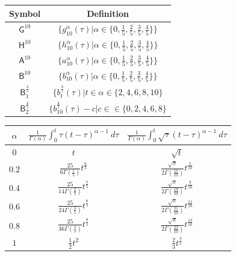 \documentclass{article}
\theoremstyle{theorem}
\theoremstyle{definition}
\begin{document}
\begin{table}[h!]
\centering
 \begin{tabular}{|c || c|} 
 \hline
 Symbol & Definition  \\ [0.1ex]
 \hline 
 \rule{0pt}{2.5ex}
 $\mathsf{G}^{10}$ & $\{g_{10}^{\alpha}(\tau)|\alpha\in\{0,\frac{1}{5},\frac{2}{5},\frac{3}{5},\frac{4}{5}\}\}$\\ [0.5ex]
 $\mathsf{H}^{10}$ & $\{h_{10}^{\alpha}(\tau)|\alpha\in\{0,\frac{1}{5},\frac{2}{5},\frac{3}{5},\frac{4}{5}\}\}$\\ [0.5ex]
 $\mathsf{A}^{10}$ & $\{a_{10}^{\alpha}(\tau)|\alpha\in\{0,\frac{1}{5},\frac{2}{5},\frac{3}{5},\frac{4}{5}\}\}$\\ [0.5ex]
 $\mathsf{B}^{10}$ & $\{b_{10}^{\alpha}(\tau)|\alpha\in\{0,\frac{1}{5},\frac{2}{5},\frac{3}{5},\frac{4}{5}\}\}$\\ [0.5ex]
 $\mathsf{B}^{\frac{4}{5}}_1$ & $\{b_{t}^{\frac{4}{5}}(\tau)|t\in\alpha\in\{2,4,6,8,10\}$\\ [0.5ex]
 $\mathsf{B}^{\frac{4}{5}}_2$ & $\{b_{10}^{\frac{4}{5}}(\tau)-c|c\in\in\{0,2,4,6,8\}$\\ [0.5ex]
 \hline 
 \end{tabular}
\end{table}


\begin{table}[h!]
\centering
 \begin{tabular}{||c|| c| c||} 
 \hline
 $\alpha$ & $\frac{1}{\Gamma(\alpha)}\int_0^t \tau(t-\tau)^{\alpha-1}~d\tau$ & $\frac{1}{\Gamma(\alpha)}\int_0^t \sqrt{\tau}(t-\tau)^{\alpha-1}~d\tau$ \\[0.5ex]
 \hline\hline
 \rule{0pt}{2.5ex}
 $0$ & $t$ & $\sqrt{t}$  \\  
 \rule{0pt}{2.5ex}
 $0.2$ & $\frac{25}{6\Gamma(\frac{1}{5})} t^{\frac{6}{5}}$  & $\frac{\sqrt{\pi}}{2\Gamma(\frac{17}{10})} t^{\frac{7}{10}}$  \\ 
 \rule{0pt}{2.5ex}
 $0.4$ & $\frac{25}{14\Gamma(\frac{2}{5})} t^{\frac{7}{5}}$  & $\frac{\sqrt{\pi}}{2\Gamma(\frac{19}{10})} t^{\frac{9}{10}}$  \\
 \rule{0pt}{2.5ex}
 $0.6$ & $\frac{25}{24\Gamma(\frac{3}{5})} t^{\frac{8}{5}}$  & $\frac{\sqrt{\pi}}{2\Gamma(\frac{21}{10})} t^{\frac{11}{10}}$  \\ 
 \rule{0pt}{2.5ex}
 $0.8$ & $\frac{25}{36\Gamma(\frac{4}{5})} t^{\frac{9}{5}}$  & $\frac{\sqrt{\pi}}{2\Gamma(\frac{23}{10})} t^{\frac{13}{10}}$  \\ 
 \rule{0pt}{2.5ex}
 $1$ & $\frac{1}{2}t^2$  & $\frac{2}{3}t^{\frac{3}{2}}$  \\ [1ex]
 \hline
 \end{tabular}
\end{table}
\end{document}

